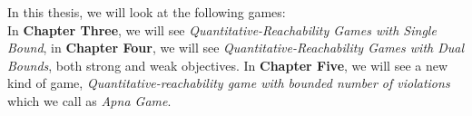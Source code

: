  \vskip 0.2cm
 In this thesis, we will look at the following games:\\
 In \textbf{Chapter Three}, we will see \textit{Quantitative-Reachability Games with Single Bound}, in \textbf{Chapter Four}, we will see \textit{Quantitative-Reachability Games with Dual Bounds}, both strong and weak objectives. In \textbf{Chapter Five}, we will see a new kind of game, \textit{Quantitative-reachability game with bounded number of violations} which we call as \textit{Apna Game}.
 
 

	
